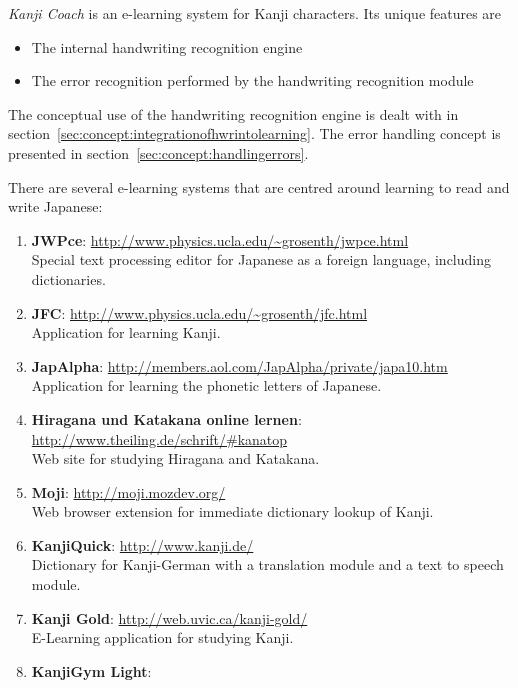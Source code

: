 \emph{Kanji Coach} is an e-learning system for Kanji characters. Its unique
features are
\begin{itemize}
  \item The internal handwriting recognition engine
  \item The error recognition performed by the handwriting recognition module
\end{itemize}

The conceptual use of the handwriting recognition engine is dealt with in 
section~\ref{sec:concept:integrationofhwrintolearning}. The error handling 
concept is presented in section~\ref{sec:concept:handlingerrors}.

There are several e-learning systems that are centred around learning to read 
and write Japanese:
\begin{enumerate}
    \item \textbf{JWPce}:
          \url{http://www.physics.ucla.edu/~grosenth/jwpce.html} \\
          Special text processing editor for Japanese as a foreign language,
          including dictionaries.
    \item \textbf{JFC}:
          \url{http://www.physics.ucla.edu/~grosenth/jfc.html} \\
          Application for learning Kanji.
    \item \textbf{JapAlpha}:
          \url{http://members.aol.com/JapAlpha/private/japa10.htm } \\
          Application for learning the phonetic letters of Japanese.
    \item \textbf{Hiragana und Katakana online lernen}:
          \url{http://www.theiling.de/schrift/#kanatop} \\
          Web site for studying Hiragana and Katakana.
    \item \textbf{Moji}:
          \url{http://moji.mozdev.org/} \\
          Web browser extension for immediate dictionary lookup of Kanji.
    \item \textbf{KanjiQuick}:
          \url{http://www.kanji.de/} \\
          Dictionary for Kanji-German with a translation module and a text to 
          speech module.
    \item \textbf{Kanji Gold}:
          \url{http://web.uvic.ca/kanji-gold/} \\
          E-Learning application for studying Kanji.
    \item \textbf{KanjiGym Light}:

\end{enumerate}

